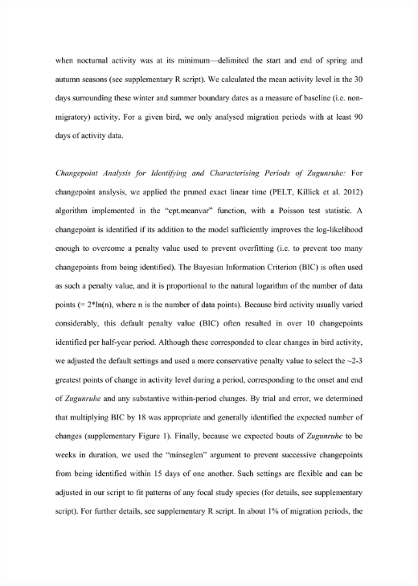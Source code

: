 \documentclass[a4paper, twoside]{templates/ociamthesis}
\begin{document}
\includegraphics[width=1\linewidth]{pdf_chapters/zug/zug_supp_crop_Part05}
\end{document}
